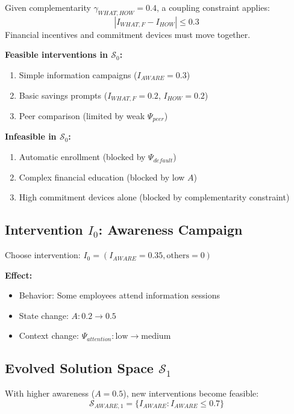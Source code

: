 Given complementarity $\gamma_{WHAT,HOW} = 0.4$, a coupling constraint applies:
\begin{equation}
|I_{WHAT,F} - I_{HOW}| \leq 0.3
\end{equation}
Financial incentives and commitment devices must move together.

\textbf{Feasible interventions in $\mathcal{S}_0$:}
\begin{enumerate}
    \item Simple information campaigns ($I_{AWARE} = 0.3$)
    \item Basic savings prompts ($I_{WHAT,F} = 0.2$, $I_{HOW} = 0.2$)
    \item Peer comparison (limited by weak $\Psi_{peer}$)
\end{enumerate}

\textbf{Infeasible in $\mathcal{S}_0$:}
\begin{enumerate}
    \item Automatic enrollment (blocked by $\Psi_{default}$)
    \item Complex financial education (blocked by low $A$)
    \item High commitment devices alone (blocked by complementarity constraint)
\end{enumerate}

\subsection{Intervention $I_0$: Awareness Campaign}

Choose intervention: $I_0 = (I_{AWARE} = 0.35, \text{others} = 0)$

\textbf{Effect:}
\begin{itemize}
    \item Behavior: Some employees attend information sessions
    \item State change: $A: 0.2 \to 0.5$
    \item Context change: $\Psi_{attention}: \text{low} \to \text{medium}$
\end{itemize}

\subsection{Evolved Solution Space $\mathcal{S}_1$}

With higher awareness ($A = 0.5$), new interventions become feasible:
\begin{equation}
\mathcal{S}_{AWARE,1} = \{I_{AWARE} : I_{AWARE} \leq 0.7\}
\end{equation}

